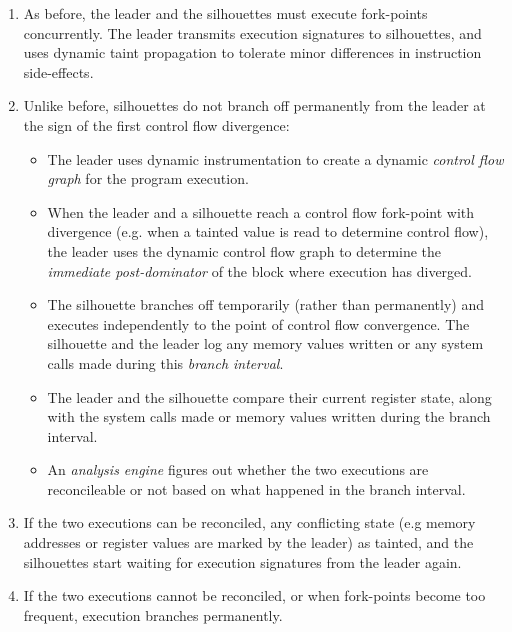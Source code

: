 \begin{enumerate}

\item As before, the leader and the
  silhouettes must execute fork-points concurrently. The leader 
  transmits execution signatures to silhouettes, and uses dynamic taint propagation 
  to tolerate minor differences in instruction side-effects.

\item Unlike before, silhouettes do not branch off permanently
  from the leader at the sign of the first control flow divergence:

\begin{itemize}
\item The leader uses dynamic instrumentation to
  create a dynamic {\em control flow graph}
  for the program execution.

\item  When the leader and a silhouette reach a
  control flow fork-point with divergence (e.g. when a tainted value
  is read to determine control flow), the
  leader uses the dynamic control flow
  graph to determine the {\em immediate post-dominator}
  of the block where execution has diverged.

\item   The silhouette branches off
  temporarily (rather than permanently)
  and executes independently to the 
  point of control flow convergence.
  The silhouette and the leader log
  any memory values written 
  or any system calls made
  during this {\em branch interval}.

\item 
  The leader and the silhouette
  compare their current register state, along with the system calls made
  or memory values written during the branch interval. 

\item  An {\em analysis engine} figures out
  whether the two executions are reconcileable
  or not based on what happened
  in the branch interval. 
\end{itemize}

\item 
  If the two executions can be reconciled,
  any conflicting state (e.g memory addresses 
  or register values are
  marked by the leader) as tainted,
  and the silhouettes start
  waiting for execution signatures
  from the leader again.

\item 
  If the two executions cannot be reconciled,
  or when fork-points become too frequent,
  execution branches permanently.
\end{enumerate}

